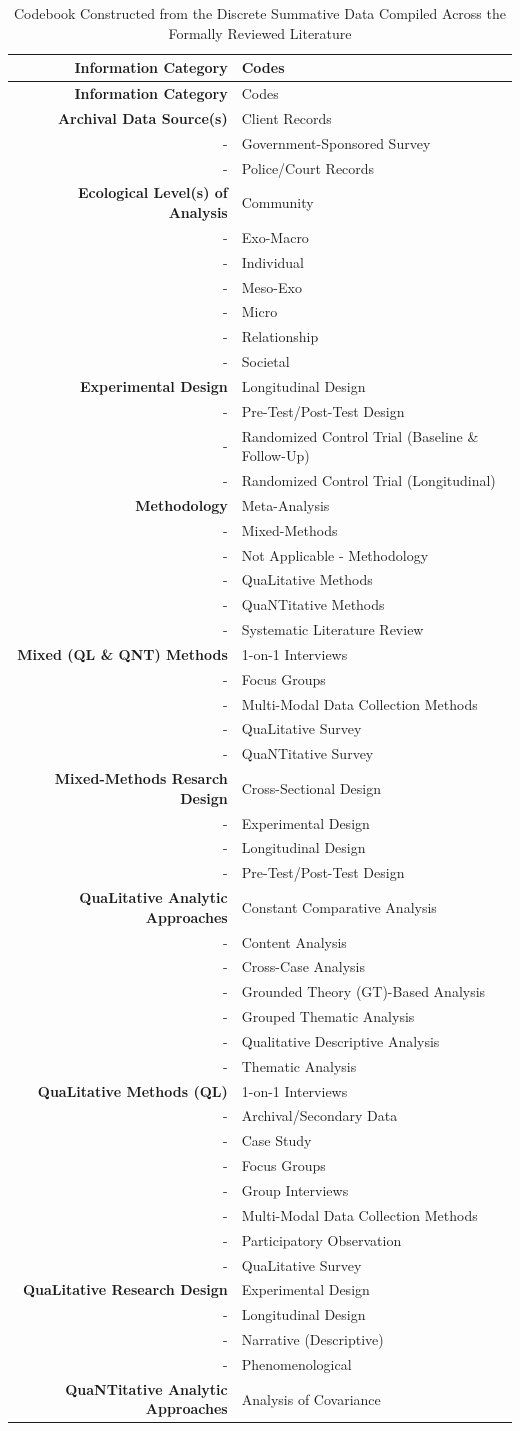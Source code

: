 \documentclass[11pt,]{tufte-book}
\begin{document}
\begin{longtable}[]{@{}rl@{}}
\caption{Codebook Constructed from the Discrete Summative Data Compiled
Across the Formally Reviewed Literature \label{tbl:cdbk}}\tabularnewline
\toprule
\textbf{Information Category} & Codes\tabularnewline
\midrule
\endfirsthead
\toprule
\textbf{Information Category} & Codes\tabularnewline
\midrule
\endhead
\textbf{Archival Data Source(s)} & Client Records\tabularnewline
- & Government-Sponsored Survey\tabularnewline
- & Police/Court Records\tabularnewline
\textbf{Ecological Level(s) of Analysis} & Community\tabularnewline
- & Exo-Macro\tabularnewline
- & Individual\tabularnewline
- & Meso-Exo\tabularnewline
- & Micro\tabularnewline
- & Relationship\tabularnewline
- & Societal\tabularnewline
\textbf{Experimental Design} & Longitudinal Design\tabularnewline
- & Pre-Test/Post-Test Design\tabularnewline
- & Randomized Control Trial (Baseline \& Follow-Up)\tabularnewline
- & Randomized Control Trial (Longitudinal)\tabularnewline
\textbf{Methodology} & Meta-Analysis\tabularnewline
- & Mixed-Methods\tabularnewline
- & Not Applicable - Methodology\tabularnewline
- & QuaLitative Methods\tabularnewline
- & QuaNTitative Methods\tabularnewline
- & Systematic Literature Review\tabularnewline
\textbf{Mixed (QL \& QNT) Methods} & 1-on-1 Interviews\tabularnewline
- & Focus Groups\tabularnewline
- & Multi-Modal Data Collection Methods\tabularnewline
- & QuaLitative Survey\tabularnewline
- & QuaNTitative Survey\tabularnewline
\textbf{Mixed-Methods Resarch Design} & Cross-Sectional
Design\tabularnewline
- & Experimental Design\tabularnewline
- & Longitudinal Design\tabularnewline
- & Pre-Test/Post-Test Design\tabularnewline
\textbf{QuaLitative Analytic Approaches} & Constant Comparative
Analysis\tabularnewline
- & Content Analysis\tabularnewline
- & Cross-Case Analysis\tabularnewline
- & Grounded Theory (GT)-Based Analysis\tabularnewline
- & Grouped Thematic Analysis\tabularnewline
- & Qualitative Descriptive Analysis\tabularnewline
- & Thematic Analysis\tabularnewline
\textbf{QuaLitative Methods (QL)} & 1-on-1 Interviews\tabularnewline
- & Archival/Secondary Data\tabularnewline
- & Case Study\tabularnewline
- & Focus Groups\tabularnewline
- & Group Interviews\tabularnewline
- & Multi-Modal Data Collection Methods\tabularnewline
- & Participatory Observation\tabularnewline
- & QuaLitative Survey\tabularnewline
\textbf{QuaLitative Research Design} & Experimental
Design\tabularnewline
- & Longitudinal Design\tabularnewline
- & Narrative (Descriptive)\tabularnewline
- & Phenomenological\tabularnewline
\textbf{QuaNTitative Analytic Approaches} & Analysis of Covariance

\end{longtable}
\end{document}
